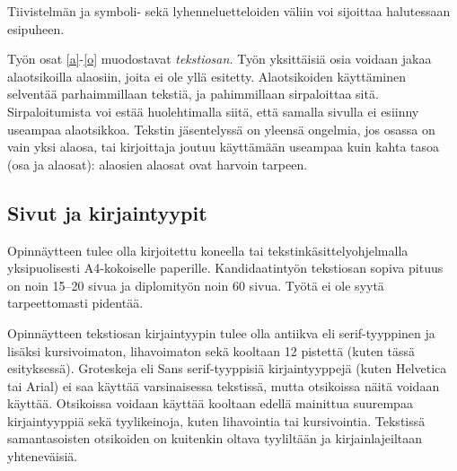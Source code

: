 \documentclass[english,12pt,a4paper,pdftex,elec,utf8]{aaltothesis}
\begin{document}
Tiivistelm\"an ja symboli- sek\"a lyhenneluetteloiden 
v\"aliin voi sijoittaa halutessaan esipuheen.  

Ty\"on osat \ref{a}-\ref{o} muodostavat \textit{tekstiosan.}  Ty\"on
yksitt\"aisi\"a osia voidaan jakaa alaotsikoilla alaosiin, joita ei ole
yll\"a esitetty. Alaotsikoiden k\"aytt\"aminen selvent\"a\"a parhaimmillaan
teksti\"a, ja pahimmillaan sirpaloittaa sit\"a.  Sirpaloitumista voi est\"a\"a
huolehtimalla siit\"a, ett\"a samalla sivulla ei esiinny useampaa
alaotsikkoa.  Tekstin j\"asentelyss\"a on yleens\"a ongelmia, jos osassa on
vain yksi alaosa, tai kirjoittaja joutuu k\"aytt\"am\"a\"an useampaa kuin
kahta tasoa (osa ja alaosat): alaosien alaosat ovat harvoin tarpeen.
\subsection*{Sivut ja kirjaintyypit}

Opinn\"aytteen tulee olla kirjoitettu koneella tai
tekstink\"asittelyohjelmalla yksipuolisesti A4-kokoiselle paperille.
Kandidaatinty\"on tekstiosan sopiva pituus on noin 15--20 sivua ja
diplomity\"on noin 60 sivua. Ty\"ot\"a ei ole syyt\"a tarpeettomasti pident\"a\"a.

Opinn\"aytteen tekstiosan kirjaintyypin tulee olla antiikva eli
serif\--tyyp\-pi\-nen ja lis\"aksi kursivoimaton, lihavoimaton sek\"a kooltaan 12
pistett\"a (kuten t\"ass\"a esityksess\"a). Groteskeja eli \textsf{Sans
  serif}-tyyppisi\"a kirjaintyyppej\"a (kuten Helvetica tai Arial) ei saa
k\"aytt\"a\"a varsinaisessa tekstiss\"a, mutta otsikoissa n\"ait\"a voidaan
k\"aytt\"a\"a.  Otsikoissa voidaan k\"aytt\"a\"a kooltaan edell\"a mainittua
suurempaa kirjaintyyppi\"a sek\"a tyylikeinoja, kuten lihavointia tai
kursivointia.  Tekstiss\"a samantasoisten otsikoiden on kuitenkin oltava
tyylilt\"a\"an ja kirjainlajeiltaan yhtenev\"aisi\"a.
\begin{table}[htb]
\caption{Taulukoissa ja kuvissa kirjaintyypin voi valita
tarkoituksenmukaisesti, mutta kuva- ja taulukkoteksteiss\"a tulee
k\"aytt\"a\"a samaa kirjaintyyppi\"a kuin varsinaisessa tekstiss\"a. 
Huomaa taulukon numeroinnin sijoittuminen taulukon yl\"apuolelle. \label{taulukko1}}
\begin{center}
\end{center}
\end{table}
\end{document}
